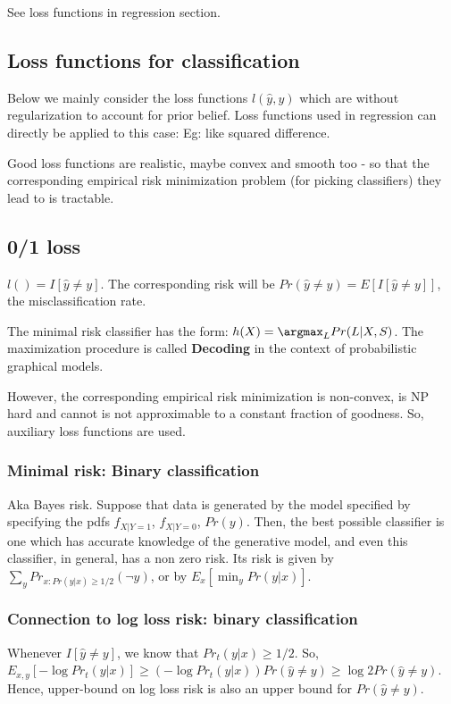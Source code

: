 \documentclass[oneside, article]{memoir}
\begin{document}
See loss functions in regression section.

\subsection{Loss functions for classification}
Below we mainly consider the loss functions $l(\hat{y}, y)$ which are without regularization to account for prior belief. Loss functions used in regression can directly be applied to this case: Eg: like squared difference.

Good loss functions are realistic, maybe convex and smooth too - so that the corresponding empirical risk minimization problem (for picking classifiers) they lead to is tractable.

\subsection{0/1 loss}
$l() = I[\hat{y} \neq y]$. The corresponding risk will be $Pr(\hat{y} \neq y) = E[I[\hat{y} \neq y]]$, the misclassification rate.

The minimal risk classifier has the form: $h(X) = \argmax_L Pr(L|X, S)$. The maximization procedure is called \textbf{Decoding} in the context of probabilistic graphical models.

However, the corresponding empirical risk minimization is non-convex, is NP hard and cannot is not approximable to a constant fraction of goodness. So, auxiliary loss functions are used.

\subsubsection{Minimal risk: Binary classification}
Aka Bayes risk. Suppose that data is generated by the model specified by specifying the pdfs $f_{X|Y=1}$, $f_{X|Y=0}$, $Pr(y)$. Then, the best possible classifier is one which has accurate knowledge of the generative model, and even this classifier, in general, has a non zero risk. Its risk is given by $\sum_y Pr_{x: Pr(y|x) \geq 1/2}(\lnot y)$, or by $E_x[\min_y Pr(y|x)]$.


\subsubsection{Connection to log loss risk: binary classification}
Whenever $I[\hat{y} \neq y]$, we know that $Pr_t(y|x) \geq 1/2$. So, $E_{x, y}[-\log Pr_t(y|x)] \geq (-\log Pr_t(y|x)) Pr(\hat{y} \neq y) \geq \log 2 Pr(\hat{y} \neq y)$. Hence, upper-bound on log loss risk is also an upper bound for $Pr(\hat{y} \neq y)$.
\end{document}
